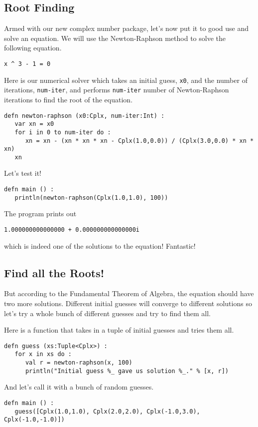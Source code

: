 \documentclass[10pt,oneside]{book}
\begin{document}
\subsection*{Root Finding}
Armed with our new complex number package, let's now put it to good use and solve an equation. We will use the Newton-Raphson method to solve the following equation.
\begin{lstlisting}
x ^ 3 - 1 = 0
\end{lstlisting}

Here is our numerical solver which takes an initial guess, \texttt{\frenchspacing x0}, and the number of iterations, \texttt{\frenchspacing num-iter}, and performs \texttt{\frenchspacing num-iter} number of Newton-Raphson iterations to find the root of the equation.
\begin{lstlisting}
defn newton-raphson (x0:Cplx, num-iter:Int) :
   var xn = x0
   for i in 0 to num-iter do :
      xn = xn - (xn * xn * xn - Cplx(1.0,0.0)) / (Cplx(3.0,0.0) * xn * xn)
   xn   
\end{lstlisting}

Let's test it!
\begin{lstlisting}
defn main () :
   println(newton-raphson(Cplx(1.0,1.0), 100))
\end{lstlisting}
The program prints out
\begin{lstlisting}
1.000000000000000 + 0.000000000000000i
\end{lstlisting}
which is indeed one of the solutions to the equation! Fantastic!

\subsection*{Find all the Roots!}
But according to the Fundamental Theorem of Algebra, the equation should have two more solutions. Different initial guesses will converge to different solutions so let's try a whole bunch of different guesses and try to find them all.

Here is a function that takes in a tuple of initial guesses and tries them all.
\begin{lstlisting}
defn guess (xs:Tuple<Cplx>) :
   for x in xs do :
      val r = newton-raphson(x, 100)
      println("Initial guess %_ gave us solution %_." % [x, r])
\end{lstlisting}

And let's call it with a bunch of random guesses.
\begin{lstlisting}
defn main () :
   guess([Cplx(1.0,1.0), Cplx(2.0,2.0), Cplx(-1.0,3.0), Cplx(-1.0,-1.0)])
\end{lstlisting}
\end{document}
